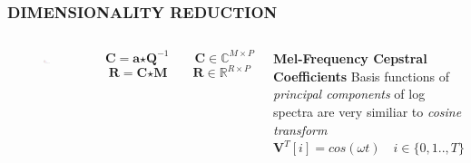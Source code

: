\documentclass{beamer}
\begin{document}
\begin{frame}
\frametitle{DIMENSIONALITY REDUCTION}
\begin{columns}[c]
\begin{figure}
\includegraphics[width=\textwidth]{dim_1}
\end{figure}
\[
\textbf{C} = \textbf{a} \bm{\star} \textbf{Q}^{-1} \qquad \textbf{C} \in \mathbb{C}^{M \times P}
\]
\[
\textbf{R} = \textbf{C} \bm{\star} \textbf{M} \qquad \textbf{R} \in \mathbb{R}^{R \times P}
\]
\begin{block}{\textbf{Mel-Frequency Cepstral Coefficients}}
Basis functions of \textit{principal components} of log spectra are very similiar to \textit{cosine transform}\\
$\textbf{V}^{T}[i] = cos( \omega t) \quad i \in \{0,1..,T\}$
\end{block}
\end{columns}
\end{frame}
\end{document}
